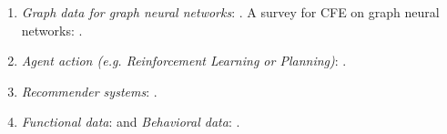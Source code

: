 \begin{enumerate}
    \item \emph{Graph data for graph neural networks}: \citep{CF-GNN1, CF-GNN2, contrastive-graph-GNN3, input_perturbation_GNN4, CF-GNN5, robust-CFE-GNN, abrate-cfe-graph-brain-networks}. A survey for CFE on graph neural networks: \citep{cfe-graph-nn-survey}. 
    
    \item \emph{Agent action (e.g. Reinforcement Learning or Planning)}: \citep{CFE_for_rl, stein-cfe-agent-navigation, brandao-cfe-agent-motion-planning}. 
    
    \item \emph{Recommender systems}: \citep{cfe-reco-approach1, cfe-reco-approach2, cfe-reco-approach3, cfe-reco-approach4, cfe-reco-approach5, cfe-reco-approach6, cfe-reco-approach7, cfe-reco-approach8, sarah_rec, anna-cfe-recos}. 
    
    \item \emph{Functional data}: \citep{kovalev-CFE-functional, carrizosa-cfe-functional} and 
    \emph{Behavioral data}: \citep{ramon-cfe-comparison-text+behavior}. 

\end{enumerate}
